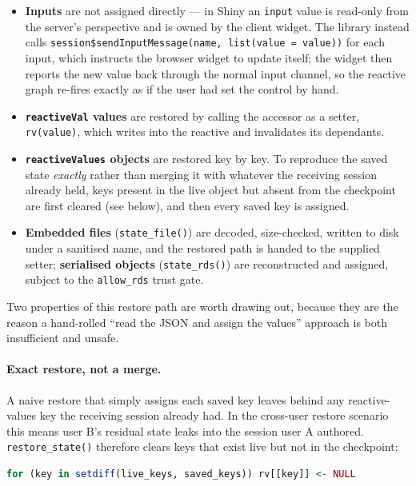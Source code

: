 \documentclass[11pt,a4paper]{article}
\begin{document}
\begin{itemize}
  \item \textbf{Inputs} are not assigned directly --- in Shiny an \texttt{input}
    value is read-only from the server's perspective and is owned by the client
    widget. The library instead calls
    \texttt{session\$sendInputMessage(name, list(value = value))} for each input,
    which instructs the browser widget to update itself; the widget then reports
    the new value back through the normal input channel, so the reactive graph
    re-fires exactly as if the user had set the control by hand.
  \item \textbf{\texttt{reactiveVal} values} are restored by calling the
    accessor as a setter, \texttt{rv(value)}, which writes into the reactive and
    invalidates its dependants.
  \item \textbf{\texttt{reactiveValues} objects} are restored key by key. To
    reproduce the saved state \emph{exactly} rather than merging it with whatever
    the receiving session already held, keys present in the live object but
    absent from the checkpoint are first cleared (see below), and then every
    saved key is assigned.
  \item \textbf{Embedded files} (\texttt{state\_file()}) are decoded, size-checked,
    written to disk under a sanitised name, and the restored path is handed to
    the supplied setter; \textbf{serialised objects} (\texttt{state\_rds()}) are
    reconstructed and assigned, subject to the \texttt{allow\_rds} trust gate.
\end{itemize}

Two properties of this restore path are worth drawing out, because they are the
reason a hand-rolled ``read the JSON and assign the values'' approach is both
insufficient and unsafe.

\paragraph{Exact restore, not a merge.} A naive restore that simply assigns each
saved key leaves behind any reactive-values key the receiving session already
had. In the cross-user restore scenario this means user B's residual state
leaks into the session user A authored. \texttt{restore\_state()} therefore
clears keys that exist live but not in the checkpoint:

\begin{lstlisting}[language=R]
for (key in setdiff(live_keys, saved_keys)) rv[[key]] <- NULL
\end{lstlisting}
\end{document}
